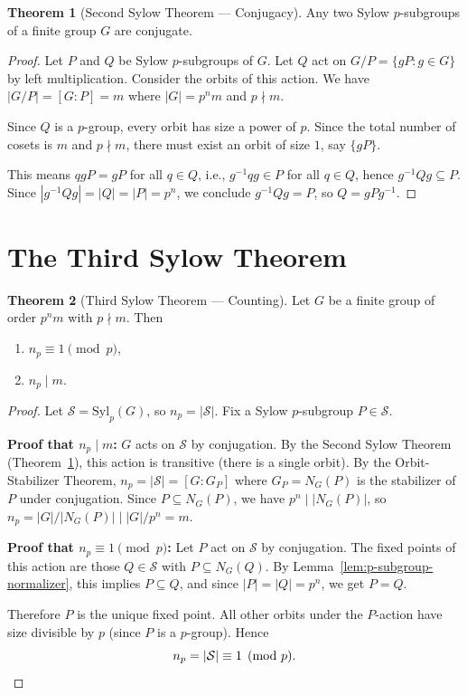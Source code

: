 \documentclass[12pt,a4paper,openany]{book}
\theoremstyle{definition}
\newtheorem{theorem}{Theorem}[chapter]
\theoremstyle{remark}
\begin{document}
\begin{theorem}[Second Sylow Theorem — Conjugacy]\label{thm:sylow-II}
Any two Sylow $p$-subgroups of a finite group $G$ are conjugate.
\end{theorem}

\begin{proof}
Let $P$ and $Q$ be Sylow $p$-subgroups of $G$.  Let $Q$ act on
$G/P = \{gP : g\in G\}$ by left multiplication.  Consider the orbits
of this action.  We have $|G/P|=[G:P]=m$ where $|G|=p^n m$ and
$p\nmid m$.

Since $Q$ is a $p$-group, every orbit has size a power of $p$.
Since the total number of cosets is $m$ and $p\nmid m$, there must
exist an orbit of size $1$, say $\{gP\}$.

This means $qgP=gP$ for all $q\in Q$, i.e., $g^{-1}qg\in P$ for all
$q\in Q$, hence $g^{-1}Qg\subseteq P$.  Since $|g^{-1}Qg|=|Q|=|P|=p^n$,
we conclude $g^{-1}Qg=P$, so $Q=gPg^{-1}$.
\end{proof}

\section{The Third Sylow Theorem}\label{sec:sylow-III}

\begin{theorem}[Third Sylow Theorem — Counting]\label{thm:sylow-III}
Let $G$ be a finite group of order $p^n m$ with $p\nmid m$.  Then
\begin{enumerate}
\item $n_p \equiv 1 \pmod{p}$,
\item $n_p \mid m$.
\end{enumerate}
\end{theorem}

\begin{proof}
Let $\mathcal{S}=\mathrm{Syl}_p(G)$, so $n_p=|\mathcal{S}|$.  Fix a
Sylow $p$-subgroup $P\in\mathcal{S}$.

\textbf{Proof that $n_p\mid m$:}
$G$ acts on $\mathcal{S}$ by conjugation.  By the Second Sylow Theorem
(Theorem~\ref{thm:sylow-II}), this action is transitive (there is
a single orbit).  By the Orbit-Stabilizer Theorem,
$n_p = |\mathcal{S}| = [G:G_P]$ where $G_P=N_G(P)$ is the stabilizer
of $P$ under conjugation.  Since $P\subseteq N_G(P)$, we have
$p^n\mid|N_G(P)|$, so
$n_p = |G|/|N_G(P)| \mid |G|/p^n = m$.

\textbf{Proof that $n_p\equiv 1\pmod{p}$:}
Let $P$ act on $\mathcal{S}$ by conjugation.  The fixed points of
this action are those $Q\in\mathcal{S}$ with $P\subseteq N_G(Q)$.
By Lemma~\ref{lem:p-subgroup-normalizer}, this implies $P\subseteq Q$,
and since $|P|=|Q|=p^n$, we get $P=Q$.

Therefore $P$ is the unique fixed point.  All other orbits under the
$P$-action have size divisible by $p$ (since $P$ is a $p$-group).
Hence
\[
   n_p = |\mathcal{S}| \equiv 1 \pmod{p}. \qedhere
\]
\end{proof}
\end{document}
